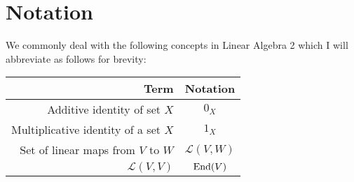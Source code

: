 \section{Notation}

We commonly deal with the following concepts in Linear Algebra 2
which I will abbreviate as follows for brevity:
\begin{center}
    \begin{tabular}{ | r | c | }
        \hline
        Term & Notation \\
        \hline \hline
        Additive identity of set $X$ & $0_X$ \\
        Multiplicative identity of a set $X$ & $1_X$ \\
        Set of linear maps from $V$ to $W$ & $\mathcal{L}(V, W)$ \\
        $\mathcal{L}(V, V)$ & $\operatorname{End}(V)$ \\
        \hline
    \end{tabular}
\end{center}